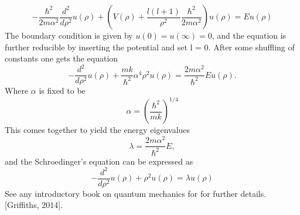 \documentclass[%
reprint,
amsmath,amssymb,
aps,
]{revtex4-1}
\begin{document}
\begin{equation*}
-\frac{\hbar^2}{2 m \alpha^2} \frac{d^2}{d\rho^2} u(\rho) 
+ \left ( V(\rho) + \frac{l (l + 1)}{\rho^2}
\frac{\hbar^2}{2 m\alpha^2} \right ) u(\rho)  = E u(\rho)
\end{equation*}
The boundary condition is given by $u(0) = u(\infty) = 0$, and the equation is further reducible by inserting the potential and set l = 0. After some shuffling of constants one gets the equation  
\begin{equation*}
-\frac{d^2}{d\rho^2} u(\rho) 
+ \frac{mk}{\hbar^2} \alpha^4\rho^2u(\rho)  = \frac{2m\alpha^2}{\hbar^2}E u(\rho) .
\end{equation*}
Where $\alpha$ is fixed to be 
\begin{equation*}
\alpha = \left(\frac{\hbar^2}{mk}\right)^{1/4}
\end{equation*}
This comes together to yield the energy eigenvalues 
\begin{equation*}
\lambda = \frac{2m\alpha^2}{\hbar^2}E,
\end{equation*}
and the Schroedinger's equation can be expressed as
\begin{equation}\label{qho}
-\frac{d^2}{d\rho^2} u(\rho) + \rho^2u(\rho)  = \lambda u(\rho)
\end{equation}
See any introductory book on quantum mechanics for for further details. [Griffiths, 2014]. 
\end{document}
